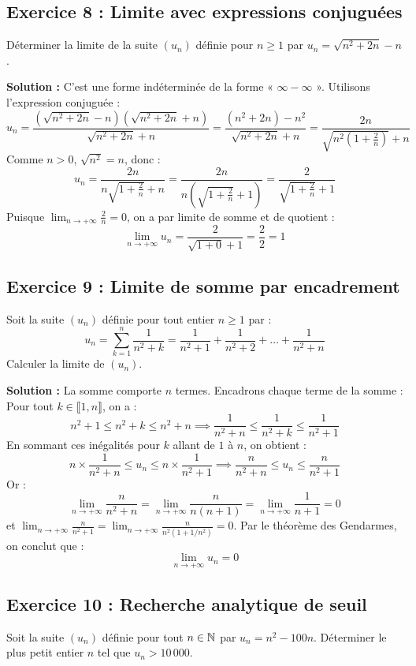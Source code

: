 \subsection*{Exercice 8 : Limite avec expressions conjuguées}
Déterminer la limite de la suite $(u_n)$ définie pour $n \ge 1$ par $u_n = \sqrt{n^2 + 2n} - n$.

\textbf{Solution :}
C'est une forme indéterminée de la forme « $\infty - \infty$ ». Utilisons l'expression conjuguée :
\[
u_n = \frac{\left(\sqrt{n^2 + 2n} - n\right)\left(\sqrt{n^2 + 2n} + n\right)}{\sqrt{n^2 + 2n} + n} = \frac{(n^2 + 2n) - n^2}{\sqrt{n^2 + 2n} + n} = \frac{2n}{\sqrt{n^2\left(1 + \frac{2}{n}\right)} + n}
\]
Comme $n > 0$, $\sqrt{n^2} = n$, donc :
\[
u_n = \frac{2n}{n\sqrt{1 + \frac{2}{n}} + n} = \frac{2n}{n \left( \sqrt{1 + \frac{2}{n}} + 1 \right)} = \frac{2}{\sqrt{1 + \frac{2}{n}} + 1}
\]
Puisque $\lim_{n \to +\infty} \frac{2}{n} = 0$, on a par limite de somme et de quotient :
\[
\lim_{n \to +\infty} u_n = \frac{2}{\sqrt{1+0} + 1} = \frac{2}{2} = 1
\]

\subsection*{Exercice 9 : Limite de somme par encadrement}
Soit la suite $(u_n)$ définie pour tout entier $n \ge 1$ par :
\[
u_n = \sum_{k=1}^n \frac{1}{n^2 + k} = \frac{1}{n^2 + 1} + \frac{1}{n^2 + 2} + \dots + \frac{1}{n^2 + n}
\]
Calculer la limite de $(u_n)$.

\textbf{Solution :}
La somme comporte $n$ termes. Encadrons chaque terme de la somme :
Pour tout $k \in \llbracket 1, n \rrbracket$, on a :
\[
n^2 + 1 \le n^2 + k \le n^2 + n \implies \frac{1}{n^2 + n} \le \frac{1}{n^2 + k} \le \frac{1}{n^2 + 1}
\]
En sommant ces inégalités pour $k$ allant de $1$ à $n$, on obtient :
\[
n \times \frac{1}{n^2 + n} \le u_n \le n \times \frac{1}{n^2 + 1} \implies \frac{n}{n^2 + n} \le u_n \le \frac{n}{n^2 + 1}
\]
Or :
\[
\lim_{n \to +\infty} \frac{n}{n^2 + n} = \lim_{n \to +\infty} \frac{n}{n(n+1)} = \lim_{n \to +\infty} \frac{1}{n+1} = 0
\]
et $\lim_{n \to +\infty} \frac{n}{n^2+1} = \lim_{n \to +\infty} \frac{n}{n^2(1+1/n^2)} = 0$.
Par le théorème des Gendarmes, on conclut que :
\[
\lim_{n \to +\infty} u_n = 0
\]

\subsection*{Exercice 10 : Recherche analytique de seuil}
Soit la suite $(u_n)$ définie pour tout $n \in \mathbb{N}$ par $u_n = n^2 - 100n$.
Déterminer le plus petit entier $n$ tel que $u_n > 10\,000$.

